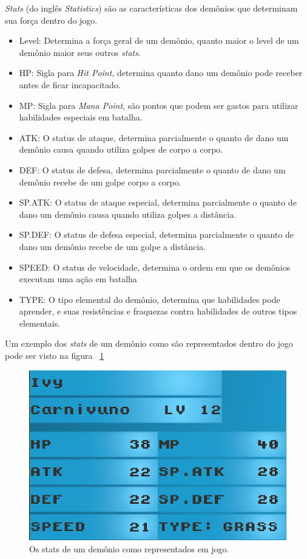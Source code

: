 \emph{Stats} (do inglês \emph{Statistics}) são as características dos demônios que determinam sua força dentro do jogo.

\begin{itemize}
\item Level: Determina a força geral de um demônio, quanto maior o level de um demônio maior seus outros \emph{stats}.
\item HP: Sigla para \emph{Hit Point}, determina quanto dano um demônio pode receber antes de ficar incapacitado.
\item MP: Sigla para \emph{Mana Point}, são pontos que podem ser gastos para utilizar habilidades especiais em batalha.
\item ATK: O status de ataque, determina parcialmente o quanto de dano um demônio causa quando utiliza golpes de corpo a corpo.
\item DEF: O status de defesa, determina parcialmente o quanto de dano um demônio recebe de um golpe corpo a corpo.
\item SP.ATK: O status de ataque especial, determina parcialmente o quanto de dano um demônio causa quando utiliza golpes a distância.
\item SP.DEF: O status de defesa especial, determina parcialmente o quanto de dano um demônio recebe de um golpe a distância.
\item SPEED:  O status de velocidade, determina o ordem em que os demônios executam uma ação em batalha
\item TYPE: O tipo elemental do demônio, determina que habilidades pode aprender, e suas resistências e fraquezas contra habilidades de outros tipos elementais.
\end{itemize}

Um exemplo dos \emph{stats} de um demônio como são representados dentro do jogo pode ser visto na figura ~\ref{fig:stats}

\begin{figure}[h!]
 \centering
  \includegraphics[width=0.5\linewidth]{statscreen.jpg}
  \caption{Os stats de um demônio como representados em jogo.}
  \label{fig:stats}
\end{figure}

